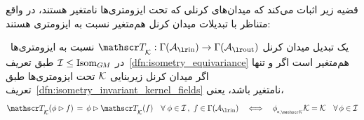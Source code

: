 قضیه زیر اثبات می‌کند که میدان‌های کرنلی که تحت ایزومتری‌ها نامتغیر هستند، در واقع متناظر با تبدیلات میدان کرنل هم‌متغیر نسبت به ایزومتری هستند:
\begin{thm}
\label{thm:isometry_equivariant_kernel_field_trafos}
 \ یک تبدیل میدان کرنل $\TK: \Gamma(\Ain)\to \Gamma(\Aout)$ نسبت به ایزومتری‌ها در $\mathcal{I} \leq \operatorname{Isom}_{G\mkern-1.4muM}$ طبق تعریف~\ref{dfn:isometry_equivariance} هم‌متغیر است اگر و تنها اگر
 میدان کرنل زیربنایی $\mathcal{K}$ تحت ایزومتری‌ها طبق تعریف~\ref{dfn:isometry_invariant_kernel_fields} نامتغیر باشد، یعنی،
    \begin{align}
        \TK(\phi \rhd f) \,=\, \phi \rhd \TK(f)
        \quad\forall\; \phi \in \I\,,\ f\in\Gamma(\Ain)
        \quad \Longleftrightarrow \quad
        \dphiK \K = \K
        \quad\forall\, \phi \in \I
    \end{align}
\end{thm}
